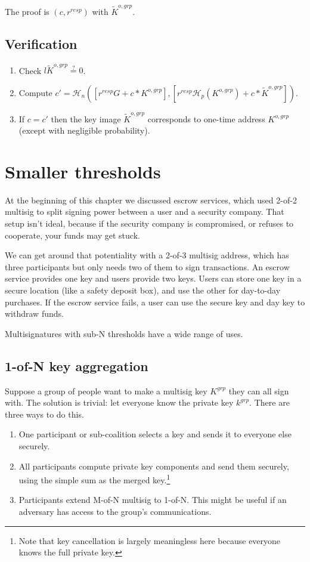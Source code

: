 The proof is $(c,r^{resp})$ with $\tilde{K}^{o,grp}$.


\subsection*{Verification}

\begin{enumerate}
    \item Check $l \tilde{K}^{o,grp} \stackrel{?}{=} 0$.
    \item Compute $c' = \mathcal{H}_n([r^{resp} G + c*K^{o,grp}],[r^{resp} \mathcal{H}_p(K^{o,grp}) + c*\tilde{K}^{o,grp}])$.
    \item If $c = c'$ then the key image $\tilde{K}^{o,grp}$ corresponds to one-time address $K^{o,grp}$ (except with negligible probability).
\end{enumerate}


    
\section{Smaller thresholds}
\label{sec:smaller-thresholds}

At the beginning of this chapter we discussed escrow services, which used 2-of-2 multisig to split signing power between a user and a security company. That setup isn't ideal, because if the security company is compromised, or refuses to cooperate, your funds may get stuck.

We can get around that potentiality with a 2-of-3 multisig address, which has three participants but only needs two of them to sign transactions. An escrow service provides one key and users provide two keys. Users can store one key in a secure location (like a safety deposit box), and use the other for day-to-day purchases. If the escrow service fails, a user can use the secure key and day key to withdraw funds.

Multisignatures with sub-N thresholds have a wide range of uses.


\subsection{1-of-N key aggregation}
\label{sec:1-of-n}

Suppose a group of people want to make a multisig key $K^{grp}$ they can all sign with. The solution is trivial: let everyone know the private key $k^{grp}$. There are three ways to do this.
\begin{enumerate}
    \item One participant or sub-coalition selects a key and sends it to everyone else securely.
    \item All participants compute private key components and send them securely, using the simple sum as the merged key.\footnote{Note that key cancellation is largely meaningless here because everyone knows the full private key.}
    \item Participants extend M-of-N multisig to 1-of-N. This might be useful if an adversary has access to the group's communications.
\end{enumerate}

